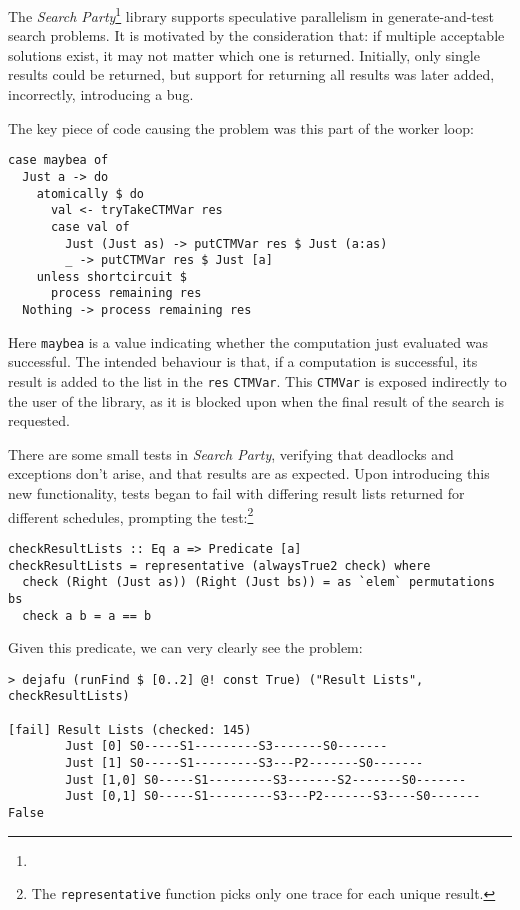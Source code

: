 The \emph{Search Party}\footnote{}
library supports speculative parallelism in generate-and-test search
problems. It is motivated by the consideration that: if multiple
acceptable solutions exist, it may not matter which one is
returned. Initially, only single results could be returned, but
support for returning all results was later added, incorrectly,
introducing a bug.

The key piece of code causing the problem was this part of the worker
loop:

\begin{verbatim}
case maybea of
  Just a -> do
    atomically $ do
      val <- tryTakeCTMVar res
      case val of
        Just (Just as) -> putCTMVar res $ Just (a:as)
        _ -> putCTMVar res $ Just [a]
    unless shortcircuit $
      process remaining res
  Nothing -> process remaining res
\end{verbatim}

Here \verb|maybea| is a value indicating whether the computation just
evaluated was successful. The intended behaviour is that, if a
computation is successful, its result is added to the list in the
\verb|res| \verb|CTMVar|. This \verb|CTMVar| is exposed indirectly to
the user of the library, as it is blocked upon when the final result
of the search is requested.

There are some small tests in \emph{Search Party}, verifying that
deadlocks and exceptions don't arise, and that results are as
expected. Upon introducing this new functionality, tests began to fail
with differing result lists returned for different schedules,
prompting the test:\footnote{The \texttt{representative} function
  picks only one trace for each unique result.}

\begin{verbatim}
checkResultLists :: Eq a => Predicate [a]
checkResultLists = representative (alwaysTrue2 check) where
  check (Right (Just as)) (Right (Just bs)) = as `elem` permutations bs
  check a b = a == b
\end{verbatim}

Given this predicate, we can very clearly see the problem:

\begin{verbatim}
> dejafu (runFind $ [0..2] @! const True) ("Result Lists", checkResultLists)

[fail] Result Lists (checked: 145)
        Just [0] S0-----S1---------S3-------S0-------
        Just [1] S0-----S1---------S3---P2-------S0-------
        Just [1,0] S0-----S1---------S3-------S2-------S0-------
        Just [0,1] S0-----S1---------S3---P2-------S3----S0-------
False
\end{verbatim}

